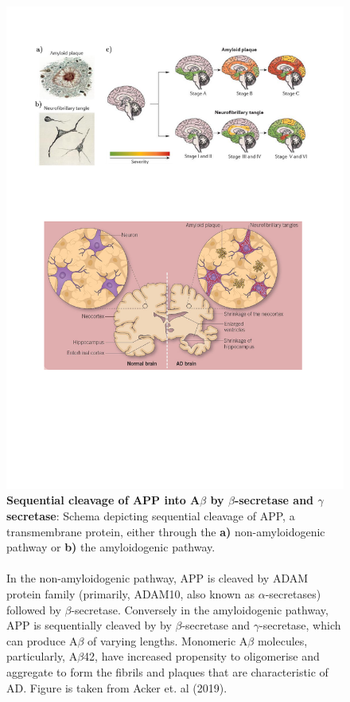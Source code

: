 \vspace{1cm}
\begin{figure}[!htp]
	\centering
	\includegraphics[page=2,trim={0 9cm 0cm 15cm},clip, scale = 0.8]{Figures/Introduction_Figures.pdf}
	\captionsetup{width=0.95\textwidth,singlelinecheck=off}
	\caption[Sequential cleavage of APP into A$\beta$ by $\beta$-secretase and $\gamma$ secretase]%
	{\textbf{Sequential cleavage of APP into A$\beta$ by $\beta$-secretase and $\gamma$ secretase}: Schema depicting sequential cleavage of APP, a transmembrane protein, either through the \textbf{a)} non-amyloidogenic pathway or \textbf{b)} the amyloidogenic pathway.
		\\
		\\
		In the non-amyloidogenic pathway, APP is cleaved by ADAM protein family (primarily, ADAM10, also known as $\alpha$-secretases) followed by $\beta$-secretase. Conversely in the amyloidogenic pathway, APP is sequentially cleaved by by $\beta$-secretase and $\gamma$-secretase, which can produce A$\beta$ of varying lengths. Monomeric A$\beta$ molecules, particularly, A$\beta$42, have increased propensity to oligomerise and aggregate to form the fibrils and plaques that are characteristic of AD. Figure is taken from Acker et. al (2019)\cite{Acker2019}. 
	}
	\label{fig:APP_Processing}
\end{figure}


